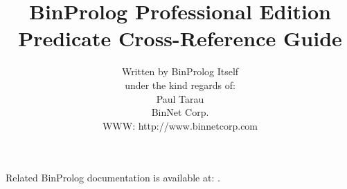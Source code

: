 \documentclass{article}
\begin{document}
\pagestyle{plain}


\title{
\Huge
BinProlog Professional Edition\\
Predicate Cross-Reference Guide \\
\vskip 5cm
}

\author{
\Large
   Written by BinProlog Itself\\
   under the kind regards of:\\
\large
   Paul Tarau\\
   BinNet Corp.\\
   WWW: http://www.binnetcorp.com\\
   \normalsize
}

\maketitle
\newpage


Related BinProlog documentation is available at: 
\cite{bp7user,bp7advanced,bp7interface,bp7crossref}.


\end{document}
